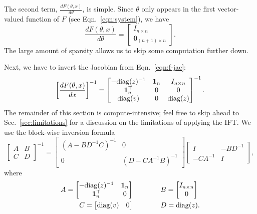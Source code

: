 \documentclass[11pt]{article}
\begin{document}
The second term, $\frac{dF(\theta,x)}{d\theta}$, is simple.
Since $\theta$ only appears in the first vector-valued function of $F$
(see Eqn.~\ref{eqn:system}), we have
\begin{equation}
\label{eqn:df-dtheta}
\frac{dF(\theta,x)}{d\theta} = \begin{bmatrix}
    I_{n\times n}\\
    \mathbf{0}_{(n+1)\times n}
\end{bmatrix}.
\end{equation}
The large amount of sparsity allows us to skip some computation further down.

Next, we have to invert the Jacobian from Eqn.~\ref{eqn:f-jac}:
\begin{equation}
\label{eqn:dsystem-matrix}
\left[\frac{dF(\theta,x)}{dx}\right]^{-1} = \begin{bmatrix}
-\mathrm{diag}(z)^{-1} & \mathbf{1}_n & I_{n\times n} \\
\mathbf{1}_n^\top & 0 & 0\\
\mathrm{diag}(v) & 0 & \mathrm{diag}(z)
\end{bmatrix}^{-1}.
\end{equation}
The remainder of this section is compute-intensive;
feel free to skip ahead to Sec.~\ref{sec:limitations} for a discussion
on the limitations of applying the IFT.
We use the block-wise inversion formula
\begin{equation*}
\begin{bmatrix}
A & B\\
C & D
\end{bmatrix}^{-1} = \begin{bmatrix}
    (A - BD^{-1}C)^{-1} & 0\\
    0 & (D - CA^{-1}B)^{-1}
\end{bmatrix}
\begin{bmatrix}
    I & -BD^{-1}\\
    -CA^{-1} & I
\end{bmatrix},
\end{equation*}
where
\begin{align*}
A = \begin{bmatrix} -\mathrm{diag}(z)^{-1} & \mathbf{1}_n \\ \mathbf{1}_n^\top & 0 \end{bmatrix}&\qquad\qquad
B = \begin{bmatrix}I_{n\times n} \\ 0\end{bmatrix}\\
C = \begin{bmatrix}\mathrm{diag}(v) & 0\end{bmatrix} &\qquad\qquad
D = \mathrm{diag}(z).
\end{align*}
\end{document}
